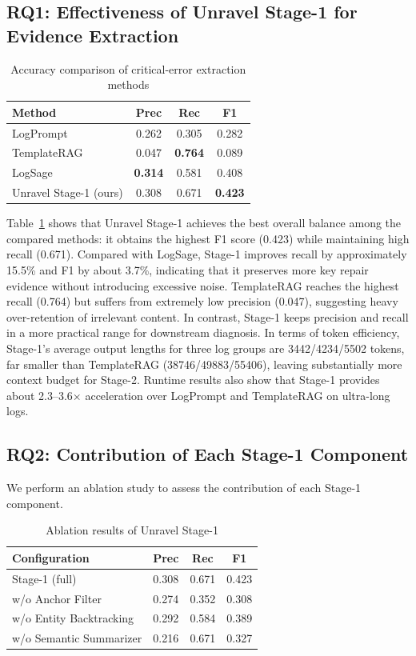\documentclass[sigconf]{acmart}
\begin{document}
\subsection{RQ1: Effectiveness of Unravel Stage-1 for Evidence Extraction}

\begin{table}[htbp]
\centering
\caption{Accuracy comparison of critical-error extraction methods}
\label{tab:mgsc-results}
\begin{tabular}{lccc}
\hline
\textbf{Method} & \textbf{Prec} & \textbf{Rec} & \textbf{F1} \\
\hline
LogPrompt & 0.262 & 0.305 & 0.282 \\
TemplateRAG & 0.047 & \textbf{0.764} & 0.089 \\
LogSage & \textbf{0.314} & 0.581 & 0.408 \\
Unravel Stage-1 (ours) & 0.308 & 0.671 & \textbf{0.423} \\
\hline
\end{tabular}
\end{table}

Table~\ref{tab:mgsc-results} shows that Unravel Stage-1 achieves the best overall balance among the compared methods: it obtains the highest F1 score (0.423) while maintaining high recall (0.671). Compared with LogSage, Stage-1 improves recall by approximately 15.5\% and F1 by about 3.7\%, indicating that it preserves more key repair evidence without introducing excessive noise. TemplateRAG reaches the highest recall (0.764) but suffers from extremely low precision (0.047), suggesting heavy over-retention of irrelevant content. In contrast, Stage-1 keeps precision and recall in a more practical range for downstream diagnosis. In terms of token efficiency, Stage-1's average output lengths for three log groups are 3442/4234/5502 tokens, far smaller than TemplateRAG (38746/49883/55406), leaving substantially more context budget for Stage-2. Runtime results also show that Stage-1 provides about 2.3--3.6$\times$ acceleration over LogPrompt and TemplateRAG on ultra-long logs.

\subsection{RQ2: Contribution of Each Stage-1 Component}

We perform an ablation study to assess the contribution of each Stage-1 component.

\begin{table}[htbp]
\centering
\caption{Ablation results of Unravel Stage-1}
\label{tab:mgsc-ablation}
\begin{tabular}{lccc}
\hline
\textbf{Configuration} & \textbf{Prec} & \textbf{Rec} & \textbf{F1} \\
\hline
Stage-1 (full) & 0.308 & 0.671 & 0.423 \\
w/o Anchor Filter & 0.274 & 0.352 & 0.308 \\
w/o Entity Backtracking & 0.292 & 0.584 & 0.389 \\
w/o Semantic Summarizer & 0.216 & 0.671 & 0.327 \\
\hline
\end{tabular}
\end{table}
\end{document}
